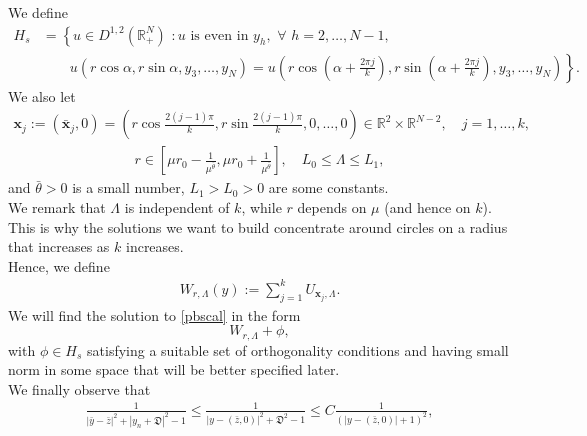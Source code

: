 \documentclass[11pt,a4paper]{amsart}
\begin{document}
We define
$$\begin{aligned}H_s&=\left\{u\in D^{1, 2}(\mathbb R^N_+)\,\,: u\,\,\mbox{is even in}\,\, y_h,\,\,\forall\,\, h=2, \ldots, N-1,\right.\\
&\quad\quad\left. u\left(r \cos \alpha, r \sin  \alpha,y_3,\ldots,y_N\right) = u\left(r \cos \left(\alpha + \frac{2\pi j}{k}\right), r \sin \left(\alpha + \frac{2\pi j}{k}\right),y_3,\ldots,y_N\right)\right\}.\end{aligned}$$
We also let \begin{align*}
  \mathbf{x}_j := \left(\bar{\mathbf{x}}_j,0\right)= \left(r \cos \frac{2\left(j-1\right)\pi}{k}, r \sin \frac{2\left(j-1\right)\pi}{k}, 0, \ldots, 0\right) \in \mathbb{R}^{2}\times \mathbb R^{N-2}, \quad j=1, \ldots, k,
\end{align*}
\begin{align*}
  r \in \left[\mu r_0 - \frac{1}{\mu^{\bar{\theta}}},\mu r_0 + \frac{1}{\mu^{\bar{\theta}}}\right],\quad L_0 \leq \Lambda \leq L_1,
\end{align*}
and $\bar{\theta}>0$ is a small number, $L_1>L_0>0$ are some constants. \\ We remark that $\Lambda$ is independent of $k$, while $r$ depends on $\mu$ (and hence on $k$). This is why the solutions we want to build concentrate around circles on a radius that increases as $k$ increases.\\ 
Hence, we define
\begin{align}\label{eq:W}
  W_{r,\Lambda}(y) := \sum_{j=1}^{k}U_{\mathbf{x}_j,\Lambda}.
\end{align}
We will find the solution to \eqref{pbscal} in the form \begin{equation}\label{eq:W1}W_{r,\Lambda} + \phi,\end{equation} with $\phi\in H_s$ satisfying a suitable set of orthogonality conditions and having small norm in some space that will be better specified later.\\ We finally observe that
\begin{align}\label{eq.observation_trans}
  \frac1{|\bar y - \bar{z}|^2+\left|y_n+\mathfrak D\right|^2-1} \leq \frac1{\left|y - \left(\bar{z}, 0\right)\right|^2+\mathfrak{D}^2-1} \leq C\frac{1}{(\left|y - \left(\bar{z}, 0\right)\right| + 1)^2},%
\end{align}
\end{document}
